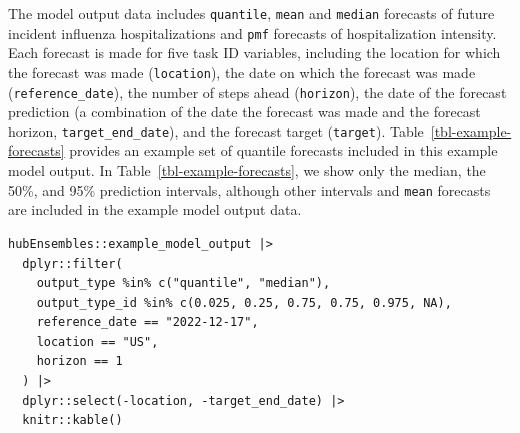 \documentclass[
  article,
  shortnames,
  notitle]{jss}
\begin{document}
The model output data includes \texttt{quantile}, \texttt{mean} and
\texttt{median} forecasts of future incident influenza hospitalizations
and \texttt{pmf} forecasts of hospitalization intensity. Each forecast
is made for five task ID variables, including the location for which the
forecast was made (\texttt{location}), the date on which the forecast
was made (\texttt{reference\_date}), the number of steps ahead
(\texttt{horizon}), the date of the forecast prediction (a combination
of the date the forecast was made and the forecast horizon,
\texttt{target\_end\_date}), and the forecast target (\texttt{target}).
Table~\ref{tbl-example-forecasts} provides an example set of quantile
forecasts included in this example model output. In
Table~\ref{tbl-example-forecasts}, we show only the median, the 50\%,
and 95\% prediction intervals, although other intervals and
\texttt{mean} forecasts are included in the example model output data.

\begin{verbatim}
hubEnsembles::example_model_output |>
  dplyr::filter(
    output_type %in% c("quantile", "median"),
    output_type_id %in% c(0.025, 0.25, 0.75, 0.75, 0.975, NA),
    reference_date == "2022-12-17",
    location == "US",
    horizon == 1
  ) |>
  dplyr::select(-location, -target_end_date) |>
  knitr::kable()
\end{verbatim}
\end{document}
